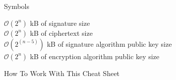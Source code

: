 \documentclass[11pt,english,a4paper, landscape]{scrartcl}
\begin{document}
\begin{minipage}[t]{0.4\textwidth}
\begin{algorithmbox}{Symbols}
\begin{tabbing}
				\>
				\>$\mathcal{O}(2^n)$ kB of signature size\\
				\>
				\> $\mathcal{O}(2^n)$ kB of ciphertext size\\
				\>
				\> $\mathcal{O}(2^{(n-5)})$ kB of signature algorithm public key size\\
				\>
				\> $\mathcal{O}(2^n)$ kB of encryption algorithm public key size\\
			\end{tabbing}
			\vspace{-6mm}
		\end{algorithmbox}
	\end{minipage}
	\hfill
	\begin{minipage}[t]{0.58\textwidth} %
		\vspace{-3mm}
		\begin{algorithmbox}{How To Work With This Cheat Sheet}
			\tbd
		\end{algorithmbox}
	\end{minipage}


\end{document}
